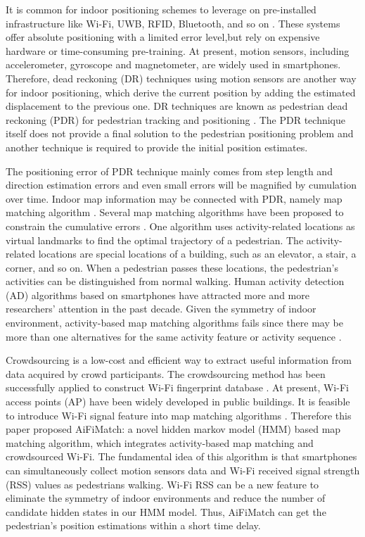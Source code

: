 \documentclass[conference]{IEEEtran}
\begin{document}
It is common for indoor positioning schemes to leverage on pre-installed infrastructure like Wi-Fi, UWB, RFID, Bluetooth, and so on \cite{bahl2000enhancements,ni2004landmarc}. These systems offer absolute positioning with a limited error level,but rely on expensive hardware or time-consuming pre-training. At present, motion sensors, including accelerometer, gyroscope and magnetometer, are widely used in smartphones. Therefore, dead reckoning (DR) techniques using motion sensors are another way for indoor positioning, which derive the current position by adding the estimated displacement to the previous one. DR techniques are known as  pedestrian dead reckoning (PDR) for pedestrian tracking and positioning \cite{zhou2015activity,zhou2015alimc}. The PDR technique itself does not provide a final solution to the pedestrian positioning problem and another technique is required to provide the initial position estimates.

The positioning error of PDR technique mainly comes from step length and direction estimation errors and even small errors will be magnified by cumulation over time. Indoor map information may be connected with PDR, namely map matching algorithm \cite{aly2015semmatch}. Several map matching algorithms have been proposed to constrain the cumulative errors \cite{zampella2015indoor,zhou2015activity,abdelnasser2016semanticslam,fu2017crowdsourcing}.  One algorithm uses activity-related locations as virtual landmarks to find the optimal trajectory of a pedestrian. The activity-related locations are special locations of a building, such as an elevator, a stair, a corner, and so on. When a pedestrian passes these locations, the pedestrian's activities can be distinguished from normal walking. Human activity detection (AD) algorithms based on smartphones have attracted more and more researchers' attention in the past decade. Given the symmetry of indoor environment, activity-based map matching algorithms fails since there may be more than one alternatives for the same activity feature or activity sequence \cite{zhou2015activity}.

Crowdsourcing is a low-cost and efficient way to extract useful information from data acquired by crowd participants. The crowdsourcing method has been successfully applied to construct Wi-Fi fingerprint database \cite{zhang2014robust}. At present, Wi-Fi access points (AP) have been widely developed in public buildings. It is feasible to introduce Wi-Fi signal feature into map matching algorithms \cite{newson2009hidden, seitz2010hidden}. Therefore this paper proposed AiFiMatch: a novel hidden markov model (HMM) based map matching algorithm, which integrates activity-based map matching and crowdsourced Wi-Fi. The fundamental idea of this algorithm is that smartphones can simultaneously collect motion sensors data and Wi-Fi received signal strength (RSS) values as pedestrians walking. Wi-Fi RSS can be a new feature to eliminate the symmetry of indoor environments and reduce the number of candidate hidden states in our HMM model. Thus, AiFiMatch can get the pedestrian's position estimations within a short time delay. 
\end{document}
